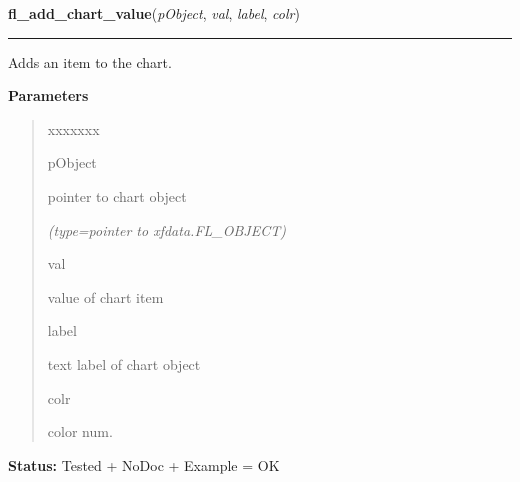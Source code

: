 \hspace{.8\funcindent}\begin{boxedminipage}{\funcwidth}

    \raggedright \textbf{fl\_add\_chart\_value}(\textit{pObject}, \textit{val}, \textit{label}, \textit{colr})

    \vspace{-1.5ex}

    \rule{\textwidth}{0.5\fboxrule}
\setlength{\parskip}{2ex}
    Adds an item to the chart.

\setlength{\parskip}{1ex}
      \textbf{Parameters}
      \vspace{-1ex}

      \begin{quote}
        \begin{Ventry}{xxxxxxx}

          \item[pObject]

          pointer to chart object

            {\it (type=pointer to xfdata.FL\_OBJECT)}

          \item[val]

          value of chart item

          \item[label]

          text label of chart object

          \item[colr]

          color num.

        \end{Ventry}

      \end{quote}

\textbf{Status:} Tested + NoDoc + Example = OK



    \end{boxedminipage}

    \label{xformslib:library:fl_insert_chart_value}

    \vspace{0.5ex}

